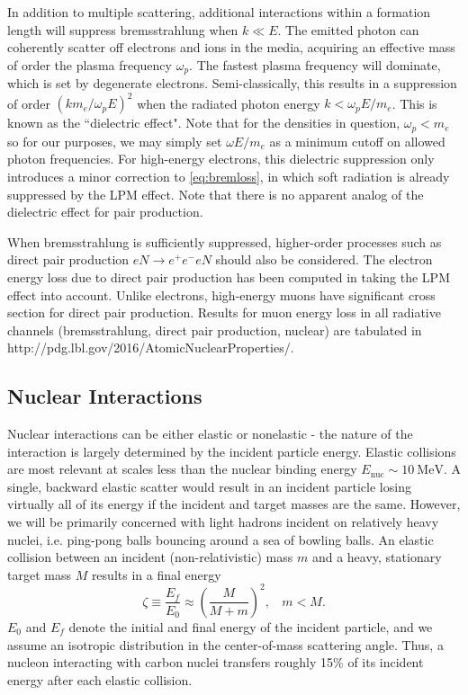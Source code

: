 \documentclass[twocolumn,showpacs,preprintnumbers,amsmath,amssymb,prd]{revtex4}
\def\r{\right)}
\def\l{\left(}
\begin{document}
\begin{appendices}
In addition to multiple scattering, additional interactions within a formation length will suppress bremsstrahlung when $k \ll E$. The emitted photon can coherently scatter off electrons and ions in the media, acquiring an effective mass of order the plasma frequency $\omega_p$. The fastest plasma frequency will dominate, which is set by degenerate electrons.
Semi-classically, this results in a suppression of order $(k m_e/\omega_p E)^2$ when the radiated photon energy $k < \omega_p E/m_e$. This is known as the ``dielectric effect". Note that for the densities in question, $\omega_p < m_e$ so for our purposes, we may simply set $\omega E/m_e$ as a minimum cutoff on allowed photon frequencies. For high-energy electrons, this dielectric suppression only introduces a minor correction to \eqref{eq:bremloss}, in which soft radiation is already suppressed by the LPM effect. Note that there is no apparent analog of the dielectric effect for pair production. 

When bremsstrahlung is sufficiently suppressed, higher-order processes such as direct pair production $e N \rightarrow e^+ e^- e N$ should also be considered. The electron energy loss due to direct pair production has been computed in \cite{Klein} taking the LPM effect into account. Unlike electrons, high-energy muons have significant cross section for direct pair production. Results for muon energy loss in all radiative channels (bremsstrahlung, direct pair production, nuclear) are tabulated in http://pdg.lbl.gov/2016/AtomicNuclearProperties/.  
\subsection*{Nuclear Interactions}

Nuclear interactions can be either elastic or nonelastic - the nature of the interaction is largely determined by the incident particle energy. Elastic collisions are most relevant at scales less than the nuclear binding energy $E_\text{nuc} \sim 10 ~\text{MeV}$. A single, backward elastic scatter would result in an incident particle losing virtually all of its energy if the incident and target masses are the same. However, we will be primarily concerned with light hadrons incident on relatively heavy nuclei, i.e. ping-pong balls bouncing around a sea of bowling balls.
An elastic collision between an incident (non-relativistic) mass $m$ and a heavy, stationary target mass $M$ results in a final energy
\begin{equation}
\label{eq:elasticratio}
\zeta \equiv \frac{E_f}{E_0} \approx \l \frac{M}{M+m} \r^2, ~~~~ m < M.
\end{equation}
$E_0$ and $E_f$ denote the initial and final energy of the incident particle, and we assume an isotropic distribution in the center-of-mass scattering angle. Thus, a nucleon interacting with carbon nuclei transfers roughly 15\% of its incident energy after each elastic collision.


\end{appendices}
\end{document}
